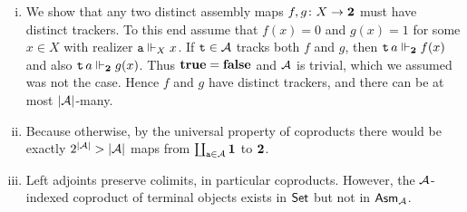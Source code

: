 \begin{enumerate}[(i)]
  \item
    We show that any two distinct assembly maps
    \(f, g \colon X \to \Two\)
    must have distinct trackers.
    To this end assume that \(f(x) = 0\) and \(g(x) = 1\) for some \(x \in X\)
    with realizer \(\pca a \realizes_X x\).
    If \(\pca t \in \AA\) tracks both \(f\) and \(g\), then
    \(\pca{t} a \realizes_{\Two} f(x)\) and also
    \(\pca{t} a \realizes_{\Two} g(x)\).
    Thus \(\pcatrue = \pcafalse\) and \(\AA\) is trivial, which we assumed
    was not the case.
    Hence \(f\) and \(g\) have distinct trackers, and there can be at most
    \(\carrier{\AA}\)-many.

  \item
    Because otherwise, by the universal property of coproducts there would be
    exactly \(2^{\carrier{\AA}} > \carrier{\AA}\) maps from
    \(\coprod_{\pca{a} \in \AA} \One\) to \(\Two\).

  \item
    Left adjoints preserve colimits, in particular coproducts.
    However, the \(\AA\)-indexed coproduct of terminal objects exists in
    \(\Set\) but not in \(\Asm\AA\).
\end{enumerate}